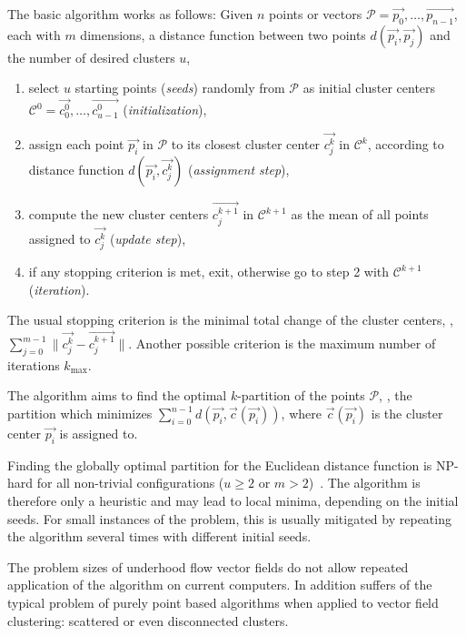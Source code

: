 The basic algorithm works as follows:
Given $n$ points or vectors $\mathcal P=\vec{p_0},\dots,\vec{p_{n-1}}$, each with $m$ dimensions, a distance function between two points $d(\vec{p_i}, \vec{p_j})$ and the number of desired clusters $u$,
%
\begin{enumerate}
%
	\item select $u$ starting points (\emph{seeds}) randomly from $\mathcal P$ as initial cluster centers $\mathcal C^0=\vec{c_{0}^0},\dots,\vec{c_{u-1}^0}$ (\emph{initialization}),
%
	\item assign each point $\vec{p_i}$ in $\mathcal P$ to its closest cluster center $\vec{c_j^k}$ in $\mathcal C^k$, according to distance function $d(\vec{p_i}, \vec{c_j^k})$ (\emph{assignment step}),
%
	\item compute the new cluster centers $\vec{c_j^{k+1}}$ in $\mathcal C^{k+1}$ as the mean of all points assigned to $\vec{c_j^k}$ (\emph{update step}),
%
	\item if any stopping criterion is met, exit, otherwise go to step 2 with $\mathcal C^{k+1}$ (\emph{iteration}).
%
\end{enumerate}
%
The usual stopping criterion is the minimal total change of the cluster centers, \eg, $\sum_{j=0}^{m-1}{\|\vec{c_j^k} - \vec{c_j^{k+1}}\|}$. Another possible criterion is the maximum number of iterations $k_{\text{max}}$.

The algorithm aims to find the optimal $k$-partition of the points $\mathcal P$, \ie, the partition which minimizes $\sum_{i=0}^{n-1}{d(\vec{p_i}, \vec{c}(\vec{p_i}))}$, where $\vec{c}(\vec{p_i})$ is the cluster center $\vec{p_i}$ is assigned to.

Finding the globally optimal partition for the Euclidean distance function is \ac{NP-hard} for all non-trivial configurations ($u \geq 2$ or $m > 2$)~\cite{Aloise, Mahajan}. The \kMeans algorithm is therefore only a heuristic and may lead to local minima, depending on the initial seeds. For small instances of the problem, this is usually mitigated by repeating the algorithm several times with different initial seeds.

The problem sizes of underhood flow vector fields do not allow repeated application of the algorithm on current computers. In addition \kMeans suffers of the typical problem of purely point based algorithms when applied to vector field clustering: scattered or even disconnected clusters.



